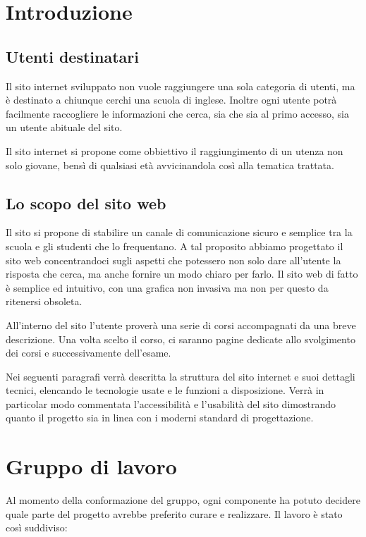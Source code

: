 \documentclass[12pt, a4paper]{article}
\begin{document}
\section{Introduzione}

\subsection{Utenti destinatari}
Il sito internet sviluppato non vuole raggiungere una sola categoria di utenti, ma è destinato a chiunque cerchi una scuola di inglese.  Inoltre ogni utente potrà facilmente raccogliere le informazioni che cerca, sia che sia al primo accesso, sia un utente abituale del sito.\par
Il sito internet si propone come obbiettivo il raggiungimento di un utenza non solo giovane, bensì di qualsiasi età avvicinandola così alla tematica trattata.

\subsection{Lo scopo del sito web}
Il sito si propone di stabilire un canale di comunicazione sicuro e semplice tra la scuola e gli studenti che lo frequentano. A tal proposito abbiamo progettato il sito web concentrandoci sugli aspetti che potessero non solo dare all’utente la risposta che cerca, ma anche fornire un modo chiaro per farlo. Il sito web di fatto è semplice ed intuitivo, con una grafica non invasiva ma non per questo da ritenersi obsoleta.\par
\smallskip
All’interno del sito l’utente proverà una serie di corsi accompagnati da una breve descrizione. Una volta scelto il corso, ci saranno pagine dedicate allo svolgimento dei corsi e successivamente dell’esame.\par
\smallskip
Nei seguenti paragrafi verrà descritta la struttura del sito internet e suoi dettagli tecnici, elencando le tecnologie usate e le funzioni a disposizione. Verrà in particolar modo commentata l’accessibilità e l’usabilità del sito dimostrando quanto il progetto sia in linea con i moderni standard di progettazione.

\section{Gruppo di lavoro}
Al momento della conformazione del gruppo, ogni componente ha potuto decidere quale parte del progetto avrebbe preferito curare e realizzare.
Il lavoro è stato così suddiviso:
\end{document}
